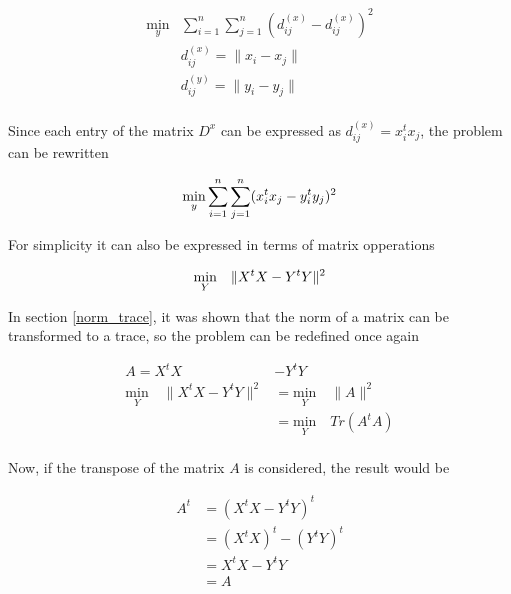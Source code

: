 \documentclass[12pt,journal]{IEEEtran}
\begin{document}
    \begin{equation*}
        \begin{aligned}
            \underset{y}{\text{min}}  & \sum_{i=1}^n \sum_{j=1}^n ( d^{(x)}_{ij} - d^{(x)}_{ij} )^2 \\
            & d_{ij}^{(x)} = \lVert x_i - x_j \rVert\\
            & d_{ij}^{(y)} = \lVert y_i - y_j \rVert
        \end{aligned}
    \end{equation*}\\

    Since each entry of the matrix $D^x$ can be expressed as
    $d_{ij}^{(x)} = x_i^t x_j$, the problem can be rewritten

    \begin{equation*}
        \underset{y}{\text{min}} \sum_{i=1}^n \sum_{j=1}^n ( x_i^t x_j - y_i^t y_j )^2 \\
    \end{equation*}

    For simplicity it can also be expressed in terms of matrix opperations

    \begin{equation*}
        \underset{Y}{\text{min}} \quad \lVert X^t X - Y^t Y \rVert^2 \\
    \end{equation*}

    In section \ref{norm_trace}, it was shown that the norm of a matrix can be
    transformed to a trace, so the problem can be redefined once again

    \begin{equation*}
        \begin{aligned}
            A = X^tX &- Y^tY\\
            \underset{Y}{\text{min}} \quad \lVert X^t X - Y^t Y \rVert^2
            &=
            \underset{Y}{\text{min}} \quad \lVert A \rVert^2\\
            &=
            \underset{Y}{\text{min}} \quad Tr(A^tA) \\
        \end{aligned}
    \end{equation*}

    Now, if the transpose of the matrix $A$ is considered, the result would be

    \begin{equation*}
        \begin{aligned}
            A^t &= (X^tX - Y^tY)^t\\
                &= (X^tX)^t - (Y^tY)^t\\
                &= X^tX - Y^tY\\
                &= A
        \end{aligned}
    \end{equation*}
\end{document}
